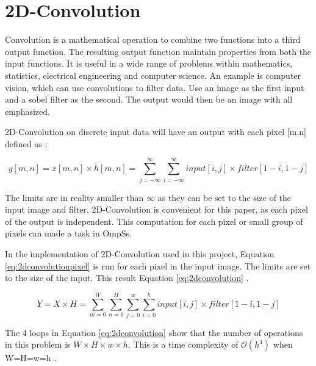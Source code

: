 \section{2D-Convolution}
Convolution is a mathematical operation to combine two functions into a third output function.
The resulting output function maintain properties from both the input functions.
It is useful in a wide range of problems within mathematics, statistics, electrical engineering and computer science.
An example is computer vision, which can use convolutions to filter data.
Use an image as the first input and a sobel filter as the second.
The output would then be an image with all emphasized.

2D-Convolution on discrete input data will have an output with each pixel [m,n] defined as \cite{lillesand13}:

\begin{equation} \label{eq:2dconvolutionpixel}
  y[m,n] = x[m,n] \times h[m,n] = \sum\limits_{j=-\infty}^\infty \sum\limits_{i=-\infty}^\infty input[i,j] \times filter[1-i, 1-j]
\end{equation}

The limits are in reality smaller than $\infty$ as they can be set to the size of the input image and filter.
2D-Convolution is convenient for this paper, as each pixel of the output is independent.
This computation for each pixel or small group of pixels can made a task in OmpSs.

In the implementation of 2D-Convolution used in this project, Equation \ref{eq:2dconvolutionpixel} is run for each pixel in the input image.
The limits are set to the size of the input.
This result Equation \ref{eq:2dconvolution} \cite{lillesand13}.

\begin{equation} \label{eq:2dconvolution}
  Y = X \times H = \sum\limits_{m=0}^W \sum\limits_{n=0}^H \sum\limits_{j=0}^{w} \sum\limits_{i=0}^{h} input[i,j] \times filter[1-i, 1-j]
\end{equation}

The 4 loops in Equation \ref{eq:2dconvolution} show that the number of operations in this problem is $W\times H\times w\times h$.
This is a time complexity of $\mathcal{O}(h^4)$ when W=H=w=h \cite{burger09}.

